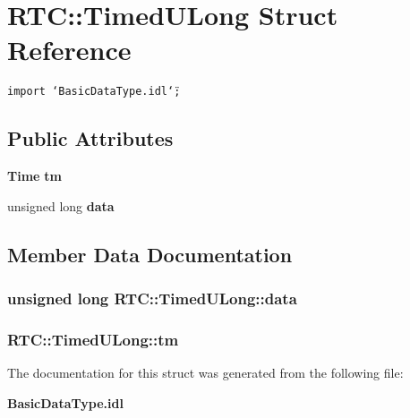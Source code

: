 \section{RTC::Timed\-ULong Struct Reference}
\label{structRTC_1_1TimedULong}
{\tt import \char`\"{}Basic\-Data\-Type.idl\char`\"{};}

\subsection*{Public Attributes}
\begin{CompactItemize}
\item 
{\bf Time} {\bf tm}
\item 
unsigned long {\bf data}
\end{CompactItemize}


\subsection{Member Data Documentation}
\subsubsection{\setlength{\rightskip}{0pt plus 5cm}unsigned long {\bf RTC::Timed\-ULong::data}}\label{structRTC_1_1TimedULong_RTC_1_1TimedULongo1}


\subsubsection{ {\bf RTC::Timed\-ULong::tm}}\label{structRTC_1_1TimedULong_RTC_1_1TimedULongo0}




The documentation for this struct was generated from the following file:\begin{CompactItemize}
\item 
{\bf Basic\-Data\-Type.idl}\end{CompactItemize}
